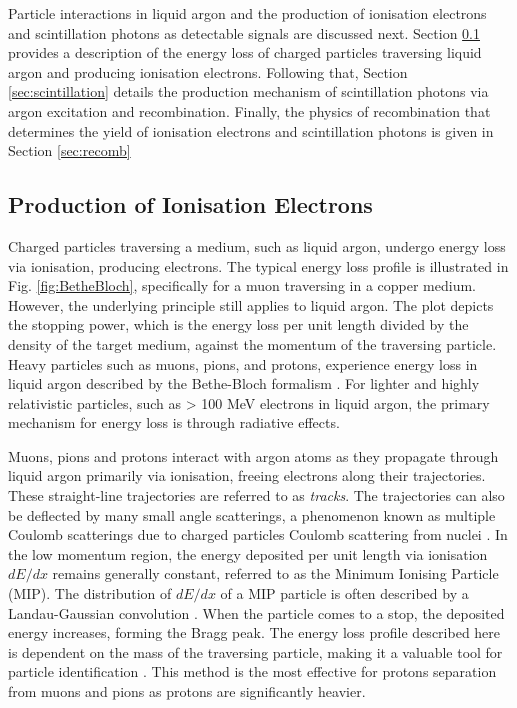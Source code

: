 Particle interactions in liquid argon and the production of ionisation electrons and scintillation photons as detectable signals are discussed next.       
Section \ref{sec3:bethebloch} provides a description of the energy loss of charged particles traversing liquid argon and producing ionisation electrons.                          
Following that, Section \ref{sec:scintillation} details the production mechanism of scintillation photons via argon excitation and recombination.                                       
Finally, the physics of recombination that determines the yield of ionisation electrons and scintillation photons is given in Section \ref{sec:recomb}
\subsection{Production of Ionisation Electrons}
\label{sec3:bethebloch}

Charged particles traversing a medium, such as liquid argon, undergo energy loss via ionisation, producing electrons.                                                                       
The typical energy loss profile is illustrated in Fig. \ref{fig:BetheBloch}, specifically for a muon traversing in a copper medium.
However, the underlying principle still applies to liquid argon.
The plot depicts the stopping power, which is the energy loss per unit length divided by the density of the target medium, against the momentum of the traversing particle.
Heavy particles such as muons, pions, and protons, experience energy loss in liquid argon described by the Bethe-Bloch formalism \cite{Passage}.
For lighter and highly relativistic particles, such as > 100 MeV electrons in liquid argon, the primary mechanism for energy loss is through radiative effects.

Muons, pions and protons interact with argon atoms as they propagate through liquid argon primarily via ionisation, freeing electrons along their trajectories.
These straight-line trajectories are referred to as \textit{tracks}.
The trajectories can also be deflected by many small angle scatterings, a phenomenon known as multiple Coulomb scatterings due to charged particles Coulomb scattering from nuclei \cite{Passage}. 
In the low momentum region, the energy deposited per unit length via ionisation $dE/dx$ remains generally constant, referred to as the Minimum Ionising Particle (MIP).
The distribution of $dE/dx$ of a MIP particle is often described by a Landau-Gaussian convolution \cite{Passage}. 
When the particle comes to a stop, the deposited energy increases, forming the Bragg peak.
The energy loss profile described here is dependent on the mass of the traversing particle, making it a valuable tool for particle identification \cite{argoneut}.
This method is the most effective for protons separation from muons and pions as protons are significantly heavier.

